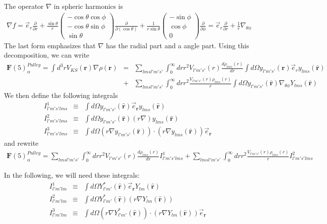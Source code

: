 \documentclass[aps,prb,floatfix,epsfig,singlecolumn,showpacs,preprintnumbers]{revtex4}
\newcommand{\vF}{{\mathbf{F}}}
\renewcommand{\vr}{{\mathbf{r}}}
\begin{document}
The operator $\nabla$ in spheric harmonics is
\begin{eqnarray}
\nabla f = \vec{e}_r\frac{\partial}{\partial r} +\frac{\sin\theta}{r}
\left(\begin{array}{c}
-\cos\theta\cos\phi\\
-\cos\theta\sin\phi\\
\sin\theta
\end{array}
\right)
\frac{\partial}{\partial (\cos\theta)} +
\frac{1}{r\sin\theta} 
\left(\begin{array}{c}
-\sin\phi\\
 \cos\phi\\
0
\end{array}
\right)
\frac{\partial}{\partial\phi}=
\vec{e}_r\frac{\partial}{\partial r} +\frac{1}{r} \nabla_{\theta\phi}
\end{eqnarray}
The last form emphasizes that $\nabla$ has the radial part and a angle
part. Using this decomposition, we can write
\begin{eqnarray}
\vF(5)^{Pulley}_\alpha=\int d^3r V_{KS}(\vr) \nabla\rho(\vr) &=& 
 \sum_{l m s l' m' s'}\int_0^\infty dr r^2  V_{l'm' s'}(r) \frac{d\rho_{lms}(r)}{dr} 
\int  d\Omega y_{l'm's'}(\hat{\vr})  \vec{e}_r y_{lms}(\hat{\vr})\\
&+&\sum_{l m s l' m' s' }\int_0^\infty dr r^2   \frac{V_{l'm' s'}(r) \rho_{lms}(r)}{r} 
\int  d\Omega y_{l'm' s'}(\hat{\vr})  \nabla_{\theta\phi} Y_{lms}(\hat{\vr})
\end{eqnarray}
We then define the following integrals
\begin{eqnarray}
I^1_{l'm's'lms} &\equiv& \int d\Omega y_{l'm's'}(\hat{\vr}) \vec{e}_\vr  y_{lms}(\hat{\vr}) \\
I^2_{l'm's'lms} &\equiv& \int d\Omega y_{l'm's'}(\hat{\vr}) (r\nabla) y_{lms}(\hat{\vr}) \\
I^3_{l'm's'lms} &\equiv& \int d\Omega (r\nabla y_{l'm's'}(\hat{\vr}))\cdot ( r\nabla  y_{lms}(\hat{\vr})) \vec{e}_\vr
\end{eqnarray}
and rewrite
\begin{eqnarray}
\vF(5)^{Pulley}_\alpha =
 \sum_{l m s l' m' s'}\int_0^\infty dr r^2  V_{l'm' s'}(r) \frac{d\rho_{lms}(r)}{dr} I^1_{l'm's'lms}
+\sum_{l m s l' m' s' }\int_0^\infty dr r^2   \frac{V_{l'm' s'}(r) \rho_{lms}(r)}{r} I^2_{l'm's'lms}
\end{eqnarray}


In the following, we will need these integrals:
\begin{eqnarray}
I^1_{l'm'lm} &\equiv& \int d\Omega Y^*_{l'm'}(\hat{\vr}) \vec{e}_\vr  Y_{lm}(\hat{\vr}) \\
I^2_{l'm'lm} &\equiv& \int d\Omega Y^*_{l'm'}(\hat{\vr}) (r\nabla Y_{lm}(\hat{\vr})) \\
I^3_{l'm'lm} &\equiv& \int d\Omega (r\nabla Y^*_{l'm'}(\hat{\vr}))\cdot ( r\nabla  Y_{lm}(\hat{\vr})) \vec{e}_\vr\\
\end{eqnarray}
\end{document}
